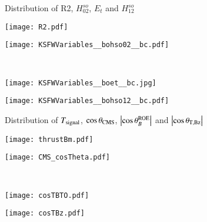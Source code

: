 \documentclass[12pt]{beamer}
\begin{document}
\begin{frame}{Distribution of R2, $H_{02}^{so}$, $E_t$ and 
	$H_{12}^{so}$}                                                                           
	\begin{minipage}[t]{0.45\textwidth}
		\centering
		\texttt{[image: R2.pdf]}
	  \end{minipage}\hfill
	  \begin{minipage}[t]{0.45\textwidth}
		\centering
		\texttt{[image: KSFWVariables\_\_bohso02\_\_bc.pdf]}
	  \end{minipage}\\[1em]
	  \begin{minipage}[b]{0.45\textwidth}
		\centering
		\texttt{[image: KSFWVariables\_\_boet\_\_bc.jpg]}
	  \end{minipage}\hfill
	  \begin{minipage}[b]{0.45\textwidth}
		\centering
		\texttt{[image: KSFWVariables\_\_bohso12\_\_bc.pdf]}
	  \end{minipage}
\end{frame}

\begin{frame}{Distribution of $T_{\rm signal}$, $\cos\theta_{\rm CMS}$, 
	$\left|\cos\theta_{B}^{\rm ROE}\right|$ and
	$\left|\cos\theta_{\rm T,Bz}\right|$}                                                                           
	\begin{minipage}[t]{0.45\textwidth}
		\centering
		\texttt{[image: thrustBm.pdf]}
	  \end{minipage}\hfill
	  \begin{minipage}[t]{0.45\textwidth}
		\centering
		\texttt{[image: CMS\_cosTheta.pdf]}
	  \end{minipage}\\[1em]
	  \begin{minipage}[b]{0.45\textwidth}
		\centering
		\texttt{[image: cosTBTO.pdf]}
	  \end{minipage}\hfill
	  \begin{minipage}[b]{0.45\textwidth}
		\centering
		\texttt{[image: cosTBz.pdf]}
	  \end{minipage}
\end{frame}
\end{document}
